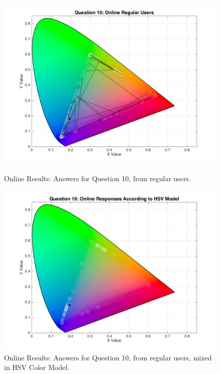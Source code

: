 \begin{figure}[htbp]
  \centering
  \begin{minipage}{0.48\textwidth}
    \centering
    \includegraphics[width=\textwidth]{images/results/10_online_regularUsers.png}
    \caption[Online Results: Answers for Question 10, from regular users.]{Online Results: Answers for Question 10, from regular users.}
    \label{fig:onlineregular_10}
  \end{minipage}\hfill
  \begin{minipage}{0.48\textwidth}
    \centering
    \includegraphics[width=\textwidth]{images/results/10_online_HSVresponses.png}
    \caption[Online Results: Answers for Question 10, from regular users, mixed in HSV Color Model.]{Online Results: Answers for Question 10, from regular users, mixed in HSV Color Model.}
    \label{fig:onlinehsvregular_10}
  \end{minipage}
\end{figure}
%

